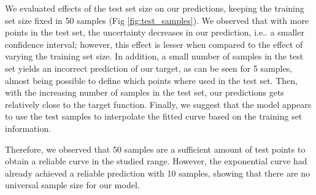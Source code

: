 \documentclass{article}
\makeatletter
\DeclareRobustCommand\onedot{\futurelet\@let@token\@onedot}
\def\@onedot{\ifx\@let@token.\else.\null\fi\xspace}
\def\ie{i.e\onedot} \def\Ie{I.e\onedot}
\makeatother
\begin{document}
We evaluated effects of the test set size on our predictions, keeping the training set size fixed in 50 samples (Fig \ref{fig:test_samples}). We observed that with more points in the test set, the uncertainty decreases in our prediction, \ie a smaller confidence interval; however, this effect is lesser when compared to the effect of varying the training set size. In addition, a small number of samples in the test set yields an incorrect prediction of our target, as can be seen for 5 samples, almost being possible to define which points where used in the test set. Then, with the increasing number of samples in the test set, our predictions gets relatively close to the target function. Finally, we suggest that the model appears to use the test samples to interpolate the fitted curve based on the training set information.

Therefore, we observed that 50 samples are a sufficient amount of test points to obtain a reliable curve in the studied range. However, the exponential curve had already achieved a reliable prediction with 10 samples, showing that there are no universal sample size for our model. 
\end{document}

